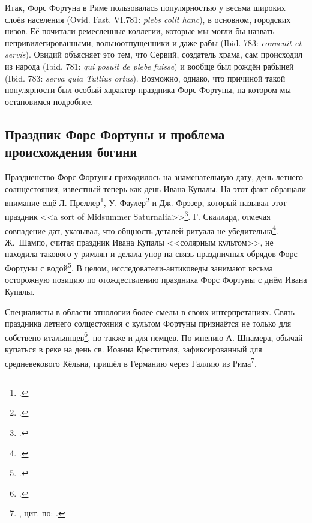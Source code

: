 
Итак, Форс Фортуна в Риме пользовалась популярностью у весьма широких слоёв населения (Ovid. Fast. VI.781: \textit{plebs colit hanc}), в основном, городских низов. Её почитали ремесленные коллегии, которые мы могли бы назвать непривилегированными, вольноотпущенники и даже рабы (Ibid. 783: \textit{convenit et servis}). Овидий объясняет это тем, что Сервий, создатель храма, сам происходил из народа (Ibid. 781: \textit{qui posuit de plebe fuisse}) и вообще был рождён рабыней (Ibid. 783: \textit{serva quia Tullius ortus}). Возможно, однако, что причиной такой популярности был особый характер праздника Форс Фортуны, на котором мы остановимся подробнее.



\subsection{Праздник Форс Фортуны и проблема происхождения богини}


Праздненство Форс Фортуны приходилось на знаменательную дату, день летнего солнцестояния, известный теперь как день Ивана Купалы. На этот факт обращали внимание ещё Л. Преллер\footcite[S. 180]{Preller1883}, У. Фаулер\footcite[P. 163]{Fowler1899} и Дж. Фрэзер, который называл этот праздник <<a sort of Midsummer Saturnalia>>\footcite[P. 272]{Frazer1911II}. Г. Скаллард, отмечая совпадение дат, указывал, что общность деталей ритуала не убедительна\footcite[P. 156]{Scullard1981}. Ж.~Шампо, считая праздник Ивана Купалы <<солярным культом>>, не находила такового у римлян и делала упор на связь праздничных обрядов Форс Фортуны с водой\footcite[Pp. 212--216]{Champeaux1982}. В целом, исследователи-антиковеды занимают весьма осторожную позицию по отождествлению праздника Форс Фортуны с днём Ивана Купалы.

Специалисты в области этнологии более смелы в своих интерпретациях. Связь праздника летнего солцестояния с культом Фортуны признаётся не только для собствено итальянцев\footcite[С. 5]{Calendar1978}, но также и для немцев. По мнению А. Шпамера, обычай купаться в реке на день св. Иоанна Крестителя, зафиксированный для средневекового Кёльна, пришёл в Германию через Галлию из Рима\footnote{\cite[S. 130]{Spamer1935}, цит. по: \cite[С. 127]{Calendar1978}.}.

